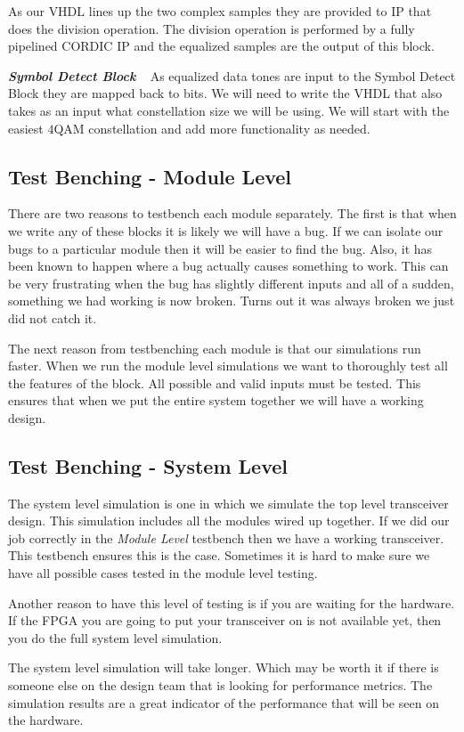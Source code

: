 As our \ac{VHDL} lines up the two complex samples they are provided to \ac{IP} that does the division operation. The division operation is performed by a fully pipelined \ac{CORDIC} \ac{IP} and the equalized samples are the output of this block.

{\bf \emph{Symbol Detect Block}} 
 
As equalized data tones are input to the Symbol Detect Block they are mapped back to bits. We will need to write the \ac{VHDL} that also takes as an input what constellation size we will be using. We will start with the easiest $4$\ac{QAM} constellation and add more functionality as needed. 

\subsection{Test Benching - Module Level}

There are two reasons to testbench each module separately. The first is that when we write any of these blocks it is likely we will have a bug. If we can isolate our bugs to a particular module then it will be easier to find the bug. Also, it has been known to happen where a bug actually causes something to work. This can be very frustrating when the bug has slightly different inputs and all of a sudden, something we had working is now broken. Turns out it was always broken we just did not catch it.

The next reason from testbenching each module is that our simulations run faster. When we run the module level simulations we want to thoroughly test all the features of the block. All possible and valid inputs must be tested. This ensures that when we put the entire system together we will have a working design.
	
\subsection{Test Benching - System Level}

The system level simulation is one in which we simulate the top level transceiver design. This simulation includes all the modules wired up together. If we did our job correctly in the \emph{Module Level} testbench then we have a working transceiver. This testbench ensures this is the case. Sometimes it is hard to make sure we have all possible cases tested in the module level testing.

Another reason to have this level of testing is if you are waiting for the hardware. If the \ac{FPGA} you are going to put your transceiver on is not available yet, then you do the full system level simulation.

The system level simulation will take longer. Which may be worth it if there is someone else on the design team that is looking for performance metrics. The simulation results are a great indicator of the performance that will be seen on the hardware.

	
	